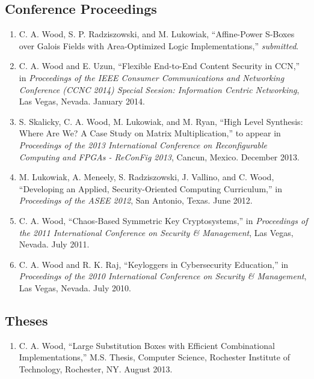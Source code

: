 \documentclass[letterpaper,10pt]{article}
\begin{document}
\subsection*{Conference Proceedings}
\begin{enumerate}[C-1.]

\item C. A. Wood, S. P. Radziszowski, and M. Lukowiak, ``Affine-Power S-Boxes over Galois Fields with Area-Optimized Logic Implementations,'' \emph{submitted}.

\item C. A. Wood and E. Uzun, ``Flexible End-to-End Content Security in CCN,'' in \emph{Proceedings of the IEEE Consumer Communications and Networking Conference (CCNC 2014) Special Seesion: Information Centric Networking}, Las Vegas, Nevada. January 2014.

\item S. Skalicky, C. A. Wood, M. Lukowiak, and M. Ryan, ``High Level Synthesis: Where Are We? A Case Study on Matrix Multiplication,'' to appear in {\it Proceedings of the 2013 International Conference on Reconfigurable Computing and FPGAs - ReConFig 2013}, Cancun, Mexico. December 2013.

\item M. Lukowiak, A. Meneely, S. Radziszowski, J. Vallino, and C. Wood, ``Developing an Applied, Security-Oriented Computing Curriculum,'' in {\it Proceedings of the ASEE 2012}, San Antonio, Texas. June 2012.

\item C. A. Wood, ``Chaos-Based Symmetric Key Cryptosystems,'' in {\it Proceedings of the 2011 International Conference on Security \& Management}, Las Vegas, Nevada. July 2011.

\item C. A. Wood and R. K. Raj, ``Keyloggers in Cybersecurity Education,'' in {\it Proceedings of the 2010 International Conference on Security \& Management}, Las Vegas, Nevada. July 2010.

\end{enumerate}

\vspace{-15pt}
\subsection*{Theses}
\begin{enumerate}[T-1.]
	\item C. A. Wood, ``Large Substitution Boxes with Efficient Combinational Implementations,'' M.S. Thesis, Computer Science, Rochester Institute of Technology, Rochester, NY. August 2013.
\end{enumerate}
\end{document}
